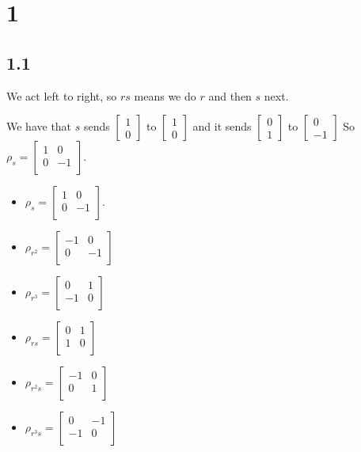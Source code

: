 \documentclass[]{article}
\begin{document}
\section*{1}
\subsection*{1.1}
We act left to right, so $rs$ means we do $r$ and then $s$ next.

We have that $s$ sends $
\begin{bmatrix}
	1\\
	0
\end{bmatrix}
$
to 
$
\begin{bmatrix}
	1\\
	0
\end{bmatrix}
$
and it sends 
$
\begin{bmatrix}
	0\\
	1
\end{bmatrix}
$
to
$
\begin{bmatrix}
	0\\
	-1
\end{bmatrix}
$
So $\rho_s =
\begin{bmatrix}
	1 & 0 \\
	0 & -1\\
\end{bmatrix}
$.
\begin{itemize}
	\item $\rho_s =
	\begin{bmatrix}
		1 & 0 \\
		0 & -1\\
	\end{bmatrix}
	$.
	\item $\rho_{r^2} = 
	\begin{bmatrix}
		-1 & 0 \\
		0 & -1\\
	\end{bmatrix}
	$
	\item $\rho_{r^3} = 
	\begin{bmatrix}
		0 & 1 \\
		-1 & 0\\
	\end{bmatrix}
	$
	\item $\rho_{rs} = 
	\begin{bmatrix}
		0 & 1 \\
		1 & 0\\
	\end{bmatrix}
	$
	\item $\rho_{r^2s} = 
	\begin{bmatrix}
		-1 & 0 \\
		0 & 1\\
	\end{bmatrix}
	$
	\item $\rho_{r^3s} = 
	\begin{bmatrix}
		0 & -1 \\
		-1 & 0\\
	\end{bmatrix}
	$
\end{itemize}
\end{document}
